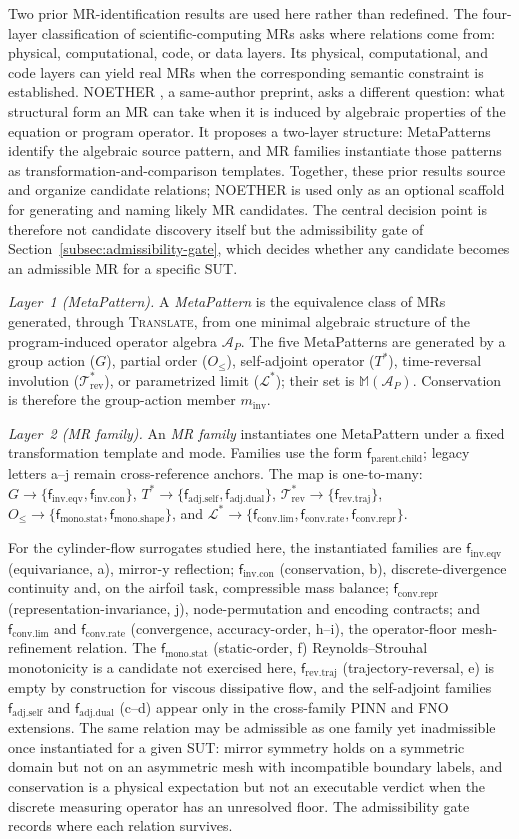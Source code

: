 \documentclass[preprint,12pt]{elsarticle}
\providecommand{\AP}{\mathcal{A}_{P}}
\providecommand{\MM}{\mathbb{M}(\mathcal{A}_{P})}
\providecommand{\Grp}{G}
\providecommand{\Ord}{O_{\le}}
\providecommand{\Sadj}{T^{*}}
\providecommand{\Trev}{\mathcal{T}^{*}_{\mathrm{rev}}}
\providecommand{\Lim}{\mathcal{L}^{*}}
\providecommand{\minv}{m_{\mathrm{inv}}}
\providecommand{\fIeqv}{\mathsf{f}_{\mathrm{inv}.\mathrm{eqv}}}
\providecommand{\fIcon}{\mathsf{f}_{\mathrm{inv}.\mathrm{con}}}
\providecommand{\fAself}{\mathsf{f}_{\mathrm{adj}.\mathrm{self}}}
\providecommand{\fAdual}{\mathsf{f}_{\mathrm{adj}.\mathrm{dual}}}
\providecommand{\fRtraj}{\mathsf{f}_{\mathrm{rev}.\mathrm{traj}}}
\providecommand{\fMstat}{\mathsf{f}_{\mathrm{mono}.\mathrm{stat}}}
\providecommand{\fMshape}{\mathsf{f}_{\mathrm{mono}.\mathrm{shape}}}
\providecommand{\fClim}{\mathsf{f}_{\mathrm{conv}.\mathrm{lim}}}
\providecommand{\fCrate}{\mathsf{f}_{\mathrm{conv}.\mathrm{rate}}}
\providecommand{\fCrepr}{\mathsf{f}_{\mathrm{conv}.\mathrm{repr}}}
\providecommand{\Translate}{\textsc{Translate}}
\begin{document}
Two prior MR-identification results are used here rather than redefined. The four-layer classification of scientific-computing MRs \citep{yang2020hierarchical} asks where relations come from: physical, computational, code, or data layers. Its physical, computational, and code layers can yield real MRs when the corresponding semantic constraint is established. NOETHER \citep{zhao2026noether}, a same-author preprint, asks a different question: what structural form an MR can take when it is induced by algebraic properties of the equation or program operator. It proposes a two-layer structure: MetaPatterns identify the algebraic source pattern, and MR families instantiate those patterns as transformation-and-comparison templates. Together, these prior results source and organize candidate relations; NOETHER is used only as an optional scaffold for generating and naming likely MR candidates. The central decision point is therefore not candidate discovery itself but the admissibility gate of Section~\ref{subsec:admissibility-gate}, which decides whether any candidate becomes an admissible MR for a specific SUT.

\emph{Layer~1 (MetaPattern).} A \emph{MetaPattern} is the equivalence class of MRs generated, through \Translate, from one minimal algebraic structure of the program-induced operator algebra $\AP$. The five MetaPatterns are generated by a group action ($\Grp$), partial order ($\Ord$), self-adjoint operator ($\Sadj$), time-reversal involution ($\Trev$), or parametrized limit ($\Lim$); their set is $\MM$. Conservation is therefore the group-action member $\minv$.

\emph{Layer~2 (MR family).} An \emph{MR family} instantiates one MetaPattern under a fixed transformation template and mode. Families use the form $\mathsf{f}_{\mathrm{parent}.\mathrm{child}}$; legacy letters a--j remain cross-reference anchors. The map is one-to-many: $\Grp \to \{\fIeqv, \fIcon\}$, $\Sadj \to \{\fAself, \fAdual\}$, $\Trev \to \{\fRtraj\}$, $\Ord \to \{\fMstat, \fMshape\}$, and $\Lim \to \{\fClim, \fCrate, \fCrepr\}$.

For the cylinder-flow surrogates studied here, the instantiated families are $\fIeqv$ (equivariance, a), mirror-y reflection; $\fIcon$ (conservation, b), discrete-divergence continuity and, on the airfoil task, compressible mass balance; $\fCrepr$ (representation-invariance, j), node-permutation and encoding contracts; and $\fClim$ and $\fCrate$ (convergence, accuracy-order, h--i), the operator-floor mesh-refinement relation. The $\fMstat$ (static-order, f) Reynolds--Strouhal monotonicity is a candidate not exercised here, $\fRtraj$ (trajectory-reversal, e) is empty by construction for viscous dissipative flow, and the self-adjoint families $\fAself$ and $\fAdual$ (c--d) appear only in the cross-family PINN and FNO extensions. The same relation may be admissible as one family yet inadmissible once instantiated for a given SUT: mirror symmetry holds on a symmetric domain but not on an asymmetric mesh with incompatible boundary labels, and conservation is a physical expectation but not an executable verdict when the discrete measuring operator has an unresolved floor. The admissibility gate records where each relation survives.
\end{document}
